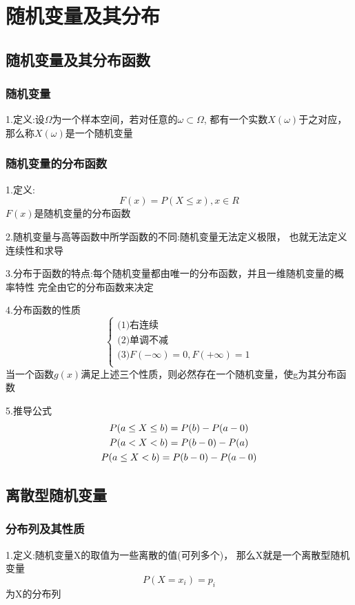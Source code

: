 \documentclass[11pt,twoside,a4paper]{ctexart}
\begin{document}
    \section{随机变量及其分布}
    \subsection{随机变量及其分布函数}
    \subsubsection{随机变量}
    1.定义:设$\varOmega  $为一个样本空间，若对任意的$\omega \subset \varOmega $,
    都有一个实数$X(\omega) $于之对应，那么称$X(\omega) $是一个随机变量
    \subsubsection{随机变量的分布函数}
    1.定义:
    \[F(x) = P(X \leq x),x \in R \]
    $F(x)$是随机变量的分布函数

    2.随机变量与高等函数中所学函数的不同:随机变量无法定义极限，
    也就无法定义连续性和求导

    3.分布于函数的特点:每个随机变量都由唯一的分布函数，并且一维随机变量的概率特性
    完全由它的分布函数来决定

    4.分布函数的性质
    \[\begin{cases}
        \text{(1)右连续  }  \\
        \text{(2)单调不减  }  \\
        \text{(3)}F(-\infty) = 0,F(+\infty) = 1  \\  

    \end{cases}\]
    当一个函数$g(x) $满足上述三个性质，则必然存在一个随机变量，使g为其分布函数

    5.推导公式
    \begin{gather}
        P(a\leq X \leq b) = P(b) - P(a - 0)  \notag \\
        P(a < X < b) = P(b - 0) - P(a)   \notag \\
        P(a\leq X < b) = P(b - 0) - P(a - 0)   \notag 
    \end{gather}

    \subsection{离散型随机变量}
    \subsubsection{分布列及其性质}
    1.定义:随机变量X的取值为一些离散的值(可列多个)，
    那么X就是一个离散型随机变量
    \[P(X = x_i) = p_i \]
    为X的分布列
\end{document}
